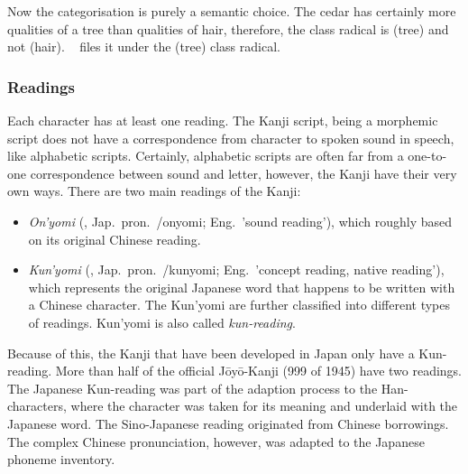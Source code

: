 Now the categorisation is purely a semantic choice. The cedar has certainly more
qualities of a tree than qualities of hair, therefore, the class radical is
 (tree) and not  (hair). 
~\citeyear{Hadamitzky1995} files it under the 
 (tree) class radical. %


\subsubsection{Readings}
\label{sec:readings}

Each character has at least one reading. The Kanji script, being a morphemic 
script does not have a correspondence from character to spoken sound in speech,
like alphabetic scripts. Certainly, alphabetic scripts are often far from a 
one-to-one correspondence between sound and letter, however, the Kanji have 
their very own ways. There are two main readings of the Kanji: \\ 
\begin{itemize}
  \item \emph{On'yomi} (, Jap.\ pron.\ /onyomi; 
        Eng.\ 'sound reading'), which roughly based on its original Chinese 
        reading.

  \item \emph{Kun'yomi} (, Jap.\ pron.\ /kunyomi; 
        Eng.\ 'concept reading, native reading'), which represents the original 
        Japanese word that happens to be written with a Chinese character. 
        The Kun'yomi are further classified into different types of readings.
        Kun'yomi is also called \emph{kun-reading}.
\end{itemize}
Because of this, the Kanji that have been developed in Japan only have a 
Kun-reading. More than half of the official Jōyō-Kanji (999 of 1945)
have two readings.
The Japanese Kun-reading was part of the adaption process to the Han-characters,
where the character was taken for its meaning and underlaid with the Japanese
word. The Sino-Japanese reading originated from Chinese borrowings. The 
complex Chinese pronunciation, however, was adapted to the Japanese 
phoneme inventory.

